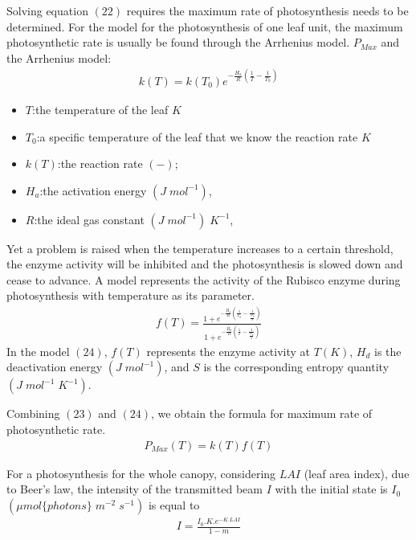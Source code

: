 \documentclass[a4paper]{article}
\numberwithin{equation}{section}
\begin{document}
Solving equation $(22)$ requires the maximum rate of photosynthesis needs to be determined. For the model for the photosynthesis of one leaf unit, the maximum photosynthetic rate is usually be found through the Arrhenius model.
\(P_{Max}\) and the Arrhenius model:
\begin{gather}
  k(T) = k(T_0)e^{-\frac{H_a}{R}(\frac{1}{T} - \frac{1}{T_0})}
\end{gather}
\begin{itemize} 
  \item \( T\):the temperature of the leaf \( K\)
  \item \( T_0\):a specific temperature of the leaf that we know the reaction rate \( K\)
  \item \(k(T) \):the reaction rate \((-)\);
  \item \( H_a\):the activation energy \((J\;mol^{-1})\),
  \item \( R\):the ideal gas constant \((J\;mol^{-1})\;K^{-1}\),
\end{itemize}



Yet a problem is raised when the temperature increases to a certain threshold, the enzyme activity will be inhibited and the photosynthesis is slowed down and cease to advance. A model represents the activity of the Rubisco enzyme during photosynthesis with temperature as its parameter.
\begin{gather}
  f(T) = \frac{1 + e^{-\frac{H_d}{R}( \frac{1}{T_0} - \frac{1}{\frac{H_d}{S}} )}}{1 + e^{-\frac{H_d}{R}(\frac{1}{T} - \frac{1}{\frac{H_d}{S}})}}
\end{gather}
In the model $(24)$, \(f(T)\) represents the enzyme activity at \(T(K)\), \(H_d\) is the deactivation energy \((J\;mol^{-1})\), and \(S\) is the corresponding entropy quantity \((J\;mol^{-1}\;K^{-1})\).

Combining $(23)$ and $(24)$, we obtain the formula for maximum rate of photosynthetic rate.
\begin{gather}
  P_{Max}(T) = k(T)f(T)
\end{gather}

For a photosynthesis for the whole canopy, considering \(LAI\) (leaf area index), due to Beer's law, the intensity of the transmitted beam \(I\) with the initial state is \(I_0\) \((\mu mol\{photons\}\;m^{-2}\;s^{-1})\) is equal to
\begin{gather}
  I = \frac{I_0.K.e^{-K.LAI}}{1 - m}
\end{gather}
\end{document}

